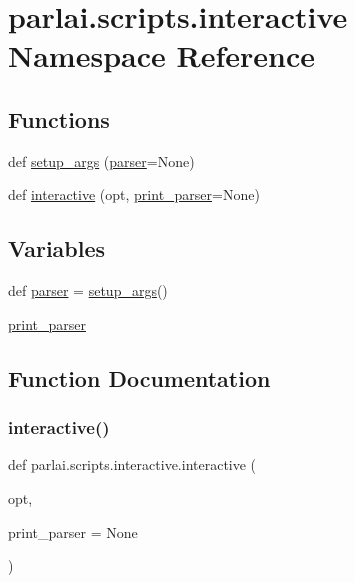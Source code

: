\hypertarget{namespaceparlai_1_1scripts_1_1interactive}{}\section{parlai.\+scripts.\+interactive Namespace Reference}
\label{namespaceparlai_1_1scripts_1_1interactive}
\subsection*{Functions}
\begin{DoxyCompactItemize}
\item 
def \hyperlink{namespaceparlai_1_1scripts_1_1interactive_a873c4ae402aee061884a22139a5a442f}{setup\+\_\+args} (\hyperlink{namespaceparlai_1_1scripts_1_1interactive_af631be047dd505af8c9365e15ed26c16}{parser}=None)
\item 
def \hyperlink{namespaceparlai_1_1scripts_1_1interactive_aae322ec752aa32b1304870833db25f13}{interactive} (opt, \hyperlink{namespaceparlai_1_1scripts_1_1interactive_a680885c6952e73c13d84a76689b5822d}{print\+\_\+parser}=None)
\end{DoxyCompactItemize}
\subsection*{Variables}
\begin{DoxyCompactItemize}
\item 
def \hyperlink{namespaceparlai_1_1scripts_1_1interactive_af631be047dd505af8c9365e15ed26c16}{parser} = \hyperlink{namespaceparlai_1_1scripts_1_1interactive_a873c4ae402aee061884a22139a5a442f}{setup\+\_\+args}()
\item 
\hyperlink{namespaceparlai_1_1scripts_1_1interactive_a680885c6952e73c13d84a76689b5822d}{print\+\_\+parser}
\end{DoxyCompactItemize}


\subsection{Function Documentation}
\mbox{\label{namespaceparlai_1_1scripts_1_1interactive_aae322ec752aa32b1304870833db25f13}} 
\subsubsection{\texorpdfstring{interactive()}{interactive()}}
{\footnotesize\ttfamily def parlai.\+scripts.\+interactive.\+interactive (\begin{DoxyParamCaption}\item[{}]{opt,  }\item[{}]{print\+\_\+parser = {\ttfamily None} }\end{DoxyParamCaption})}

